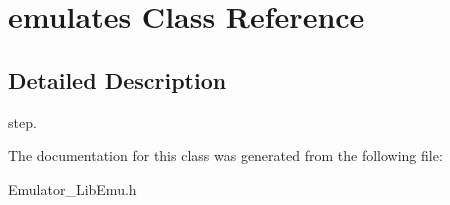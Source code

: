 \hypertarget{classemulates}{
\section{emulates Class Reference}
\label{classemulates}
}


\subsection{Detailed Description}
step. 

The documentation for this class was generated from the following file:\begin{DoxyCompactItemize}
\item 
Emulator\_\-LibEmu.h\end{DoxyCompactItemize}
